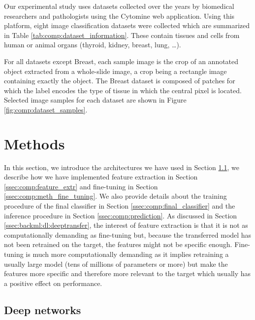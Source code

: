 Our experimental study uses datasets collected over the years by biomedical researchers and pathologists using the Cytomine \cite{maree2016collaborative} web application. Using this platform, eight image classification datasets were collected which are summarized in Table \ref{tab:comp:dataset_information}. These contain tissues and cells from human or animal organs (thyroid, kidney, breast, lung, \ldots).

For all datasets except Breast, each sample image is the crop of an annotated object extracted from a whole-slide image, a crop being a rectangle image containing exactly the object. The Breast dataset is composed of patches for which the label encodes the type of tissue in which the central pixel is located. Selected image samples for each dataset are shown in Figure \ref{fig:comp:dataset_samples}. 

\section{Methods}
\label{sec:comp:methods}

In this section, we introduce the architectures we have used in Section \ref{ssec:comp:deep_networks}, we describe how we have implemented feature extraction in Section \ref{ssec:comp:feature_extr} and fine-tuning in Section \ref{ssec:comp:meth_fine_tuning}. We also provide details about the training procedure of the final classifier in Section \ref{ssec:comp:final_classifier} and the inference procedure in Section \ref{ssec:comp:prediction}. As discussed in Section \ref{ssec:backml:dl:deeptransfer}, the interest of feature extraction is that it is not as computationally demanding as fine-tuning but, because the transferred model has not been retrained on the target, the features might not be specific enough. Fine-tuning is much more computationally demanding as it implies retraining a usually large model (\ie tens of millions of parameters or more) but make the features more specific and therefore more relevant to the target which usually has a positive effect on performance. 

\subsection{Deep networks}
\label{ssec:comp:deep_networks}

